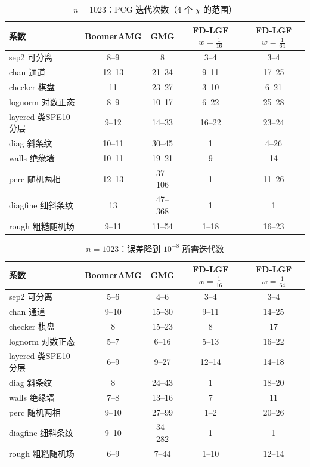 \begin{table}[H]\centering\small
\caption{$n=1023$：PCG 迭代次数（4 个 $\chi$ 的范围）}\label{tab:its}
\begin{tabular}{lcccc}
\toprule
系数 & BoomerAMG & GMG & FD-LGF $w{=}\frac1{16}$ & FD-LGF $w{=}\frac1{64}$ \\
\midrule
sep2 可分离 & 8--9 & 8 & 3--4 & 3--4 \\
chan 通道 & 12--13 & 21--34 & 9--11 & 17--25 \\
checker 棋盘 & 11 & 23--27 & 3--10 & 6--21 \\
lognorm 对数正态 & 8--9 & 10--17 & 6--22 & 25--28 \\
layered 类SPE10分层 & 9--12 & 14--33 & 16--22 & 23--24 \\
diag 斜条纹 & 10--11 & 30--45 & 1 & 4--26 \\
walls 绝缘墙 & 10--11 & 19--21 & 9 & 14 \\
perc 随机两相 & 12--13 & 37--106 & 1 & 11--26 \\
diagfine 细斜条纹 & 13 & 47--368 & 1 & 1 \\
rough 粗糙随机场 & 9--11 & 11--54 & 1--18 & 16--23 \\
\bottomrule
\end{tabular}
\end{table}

\begin{table}[H]\centering\small
\caption{$n=1023$：误差降到 $10^{-8}$ 所需迭代数}\label{tab:k8}
\begin{tabular}{lcccc}
\toprule
系数 & BoomerAMG & GMG & FD-LGF $w{=}\frac1{16}$ & FD-LGF $w{=}\frac1{64}$ \\
\midrule
sep2 可分离 & 5--6 & 4--6 & 3--4 & 3--4 \\
chan 通道 & 9--10 & 15--30 & 9--11 & 14--25 \\
checker 棋盘 & 8 & 15--23 & 8 & 17 \\
lognorm 对数正态 & 5--7 & 6--16 & 5--13 & 16--22 \\
layered 类SPE10分层 & 6--9 & 9--27 & 12--14 & 14--18 \\
diag 斜条纹 & 8 & 24--43 & 1 & 18--20 \\
walls 绝缘墙 & 7--8 & 13--16 & 7 & 11 \\
perc 随机两相 & 9--10 & 27--99 & 1--2 & 20--26 \\
diagfine 细斜条纹 & 9--10 & 34--282 & 1 & 1 \\
rough 粗糙随机场 & 6--9 & 7--44 & 1--10 & 12--14 \\
\bottomrule
\end{tabular}
\end{table}

